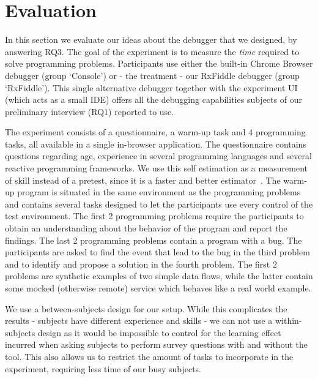 \section{Evaluation}
\label{section-evaluation}

In this section we evaluate our ideas about the debugger that we designed, by answering RQ3. 
The goal of the experiment is to measure the \textit{time} required to solve programming problems. Participants use either the built-in Chrome Browser debugger (group `Console') or - the treatment - our RxFiddle debugger (group `RxFiddle'). This single alternative debugger together with the experiment UI (which acts as a small IDE) offers all the debugging capabilities subjects of our preliminary interview (RQ1) reported to use.

The experiment consists of a questionnaire, a warm-up task and 4 programming tasks, all available in a single in-browser application. The questionnaire contains questions regarding age, experience in several programming languages and several reactive programming frameworks. We use this self estimation as a measurement of skill instead of a pretest, since it is a faster and better estimator~\cite{kleinschmager2011rate,feigenspan2012measuring,siegmund2014measuring}. The warm-up program is situated in the same environment as the programming problems and contains several tasks designed to let the participants use every control of the test environment. The first 2 programming problems require the participants to obtain an understanding about the behavior of the program and report the findings. The last 2 programming problems contain a program with a bug. The participants are asked to find the event that lead to the bug in the third problem and to identify and propose a solution in the fourth problem. The first 2 problems are synthetic examples of two simple data flows, while the latter contain some mocked (otherwise remote) service which behaves like a real world example.

We use a between-subjects design for our setup. While this complicates the results - subjects have different experience and skills - we can not use a within-subjects design as it would be impossible to control for the learning effect incurred when asking subjects to perform survey questions with and without the tool. This also allows us to restrict the amount of tasks to incorporate in the experiment, requiring less time of our busy subjects.


